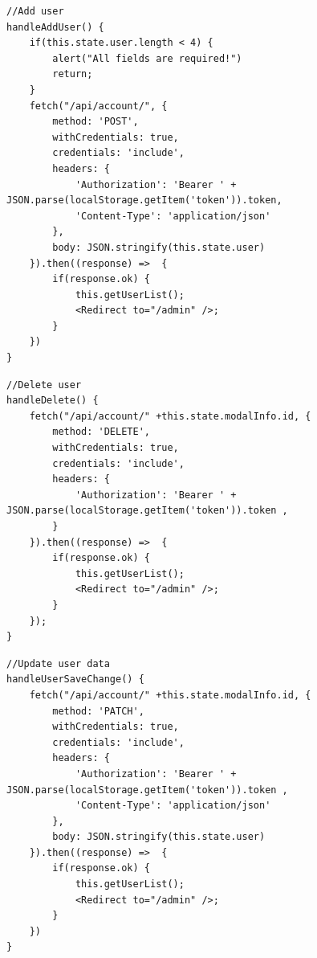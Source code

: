 \documentclass{report}
\begin{document}
\begin{lstlisting}
//Add user
handleAddUser() {
	if(this.state.user.length < 4) {
		alert("All fields are required!")
		return;
	}
	fetch("/api/account/", {
		method: 'POST',
		withCredentials: true,
		credentials: 'include',
		headers: {
			'Authorization': 'Bearer ' + JSON.parse(localStorage.getItem('token')).token,
			'Content-Type': 'application/json'
		},
		body: JSON.stringify(this.state.user)
	}).then((response) =>  {
		if(response.ok) {
			this.getUserList();
			<Redirect to="/admin" />;
		}
	})
}
\end{lstlisting}
\begin{lstlisting}
//Delete user
handleDelete() {
	fetch("/api/account/" +this.state.modalInfo.id, {
		method: 'DELETE',
		withCredentials: true,
		credentials: 'include',
		headers: {
			'Authorization': 'Bearer ' + JSON.parse(localStorage.getItem('token')).token ,
		}
	}).then((response) =>  {
		if(response.ok) {
			this.getUserList();
			<Redirect to="/admin" />;
		}
	});
}
\end{lstlisting}
\begin{lstlisting}
//Update user data
handleUserSaveChange() {
	fetch("/api/account/" +this.state.modalInfo.id, {
		method: 'PATCH',
		withCredentials: true,
		credentials: 'include',
		headers: {
			'Authorization': 'Bearer ' + JSON.parse(localStorage.getItem('token')).token ,
			'Content-Type': 'application/json'
		},
		body: JSON.stringify(this.state.user)
	}).then((response) =>  {
		if(response.ok) {
			this.getUserList();
			<Redirect to="/admin" />;
		}
	})
}
\end{lstlisting}
\end{document}
